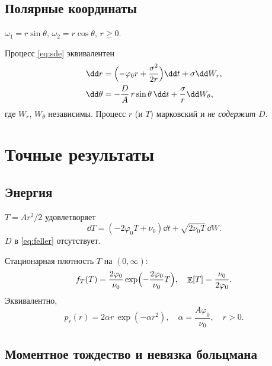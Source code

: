 \documentclass[12pt,a4paper]{article}
\DeclareMathOperator{\E}{\mathbb{E}}
\newcommand{\phiz}{\varphi_0}
\newcommand{\nuz}{\nu_0}
\begin{document}
\subsection{Полярные координаты}

$\omega_1=r\sin\theta$, $\omega_2=r\cos\theta$, $r\ge0$.

\begin{lemma}\label{lem:polar}
Процесс \eqref{eq:sde} эквивалентен
\begin{align}
  \dd r &= \Bigl(-\phiz r+\frac{\sigma^2}{2r}\Bigr)\dd t+\sigma\dd W_r,
  \label{eq:polar-r}\\
  \dd\theta &= -\frac{D}{A}\,r\sin\theta\,\dd t+\frac{\sigma}{r}\dd W_\theta,
  \label{eq:polar-theta}
\end{align}
где $W_r$, $W_\theta$ независимы. Процесс $r$ (и $T$) марковский и \emph{не содержит} $D$.
\end{lemma}

\section{Точные результаты}

\subsection{Энергия}

\begin{proposition}\label{prop:feller}
$T=Ar^2/2$ удовлетворяет
\begin{equation}\label{eq:feller}
  \dd T=(-2\phiz T+\nuz)\dd t+\sqrt{2\nuz T}\,\dd W.
\end{equation}
$D$ в \eqref{eq:feller} отсутствует.
\end{proposition}

\begin{proposition}\label{prop:energy}
Стационарная плотность $T$ на $(0,\infty)$:
\begin{equation}\label{eq:fT}
  f_T(T)=\frac{2\phiz}{\nuz}\exp\Bigl(-\frac{2\phiz}{\nuz}T\Bigr),
  \quad \E[T]=\frac{\nuz}{2\phiz}.
\end{equation}
Эквивалентно,
\begin{equation}\label{eq:rayleigh}
  p_r(r)=2\alpha r\,\exp(-\alpha r^2),\quad \alpha=\frac{A\phiz}{\nuz},\quad r>0.
\end{equation}
\end{proposition}

\subsection{Моментное тождество и невязка больцмана}
\end{document}
